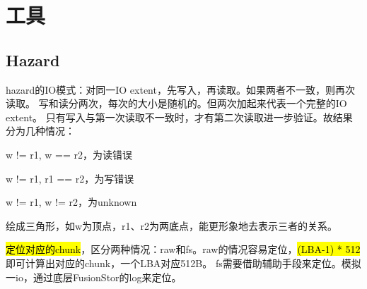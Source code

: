 \section{工具}

\subsection{Hazard}

hazard的IO模式：对同一IO extent，先写入，再读取。如果两者不一致，则再次读取。
写和读分两次，每次的大小是随机的。但两次加起来代表一个完整的IO extent。
只有写入与第一次读取不一致时，才有第二次读取进一步验证。故结果分为几种情况：
\begin{enumbox}
\item w != r1, w == r2，为读错误
\item w != r1, r1 == r2，为写错误
\item w != r1, w != r2，为unknown
\end{enumbox}

绘成三角形，如w为顶点，r1、r2为两底点，能更形象地去表示三者的关系。

\hl{定位对应的chunk}，区分两种情况：raw和fs。raw的情况容易定位，\hl{(LBA-1) * 512}即可计算出对应的chunk，一个LBA对应512B。
fs需要借助辅助手段来定位。模拟一io，通过底层FusionStor的log来定位。
